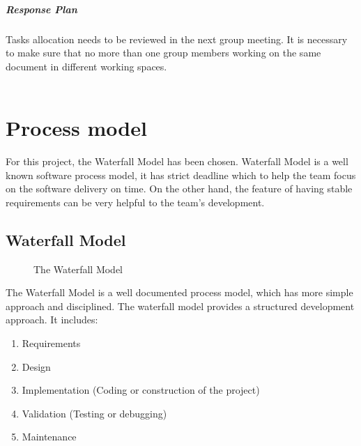 \documentclass[11pt, a4paper]{report}
\begin{document}
	\paragraph{Response Plan}Tasks allocation needs to be reviewed in the next group meeting. It is necessary to make sure that no more than one group members working on the same document in different working spaces. \\\\


\pagebreak
\chapter{Process model}
For this project, the Waterfall Model has been chosen. Waterfall Model is a well known software process model, it has strict deadline which to help the team focus on the software delivery on time. On the other hand, the feature of having stable requirements can be very helpful to the team's development. 

\section{Waterfall Model}

\begin{figure}[ht]
\centering
\setlength\fboxsep{2pt}
\setlength\fboxrule{0.2pt}
\caption{The Waterfall Model}
\label{sec:WTF}
\label{fig:WTF}
\end{figure}

The Waterfall Model is a well documented process model, which has more simple approach and disciplined. The waterfall model provides a structured development approach. It includes:
\begin{enumerate}
	\item  Requirements
	\item  Design
	\item  Implementation (Coding or construction of the project)
	\item  Validation (Testing or debugging)
	\item  Maintenance
\end{enumerate}
\end{document}
